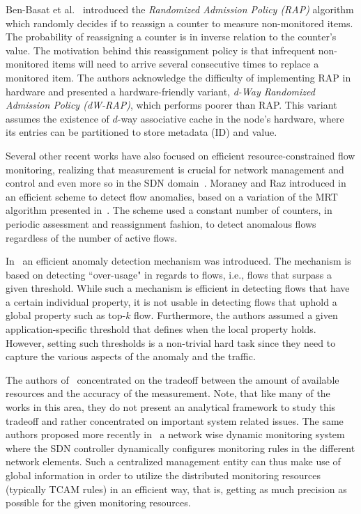 Ben-Basat et al.~\cite{Ben-Basat2017} introduced the \textit{Randomized Admission Policy (RAP)} algorithm which randomly decides if to reassign a counter to measure non-monitored items. The probability of reassigning a counter is in inverse relation to the counter's value. The motivation behind this reassignment policy is that infrequent non-monitored items will need to arrive several consecutive times to replace a monitored item. The authors acknowledge the difficulty of implementing RAP in hardware and presented a hardware-friendly variant, \textit{d-Way Randomized Admission Policy (dW-RAP)}, which performs poorer than RAP. This variant assumes the existence of $d$-way associative cache in the node's hardware, where its entries can be partitioned to store metadata (ID) and value.

Several other recent works have also focused on efficient resource-constrained flow monitoring, realizing that measurement is crucial for network management and control and even more so in the SDN domain~\cite{Moraney2016, Moshref2013, Moshref2014}. Moraney and Raz introduced in~\cite{Moraney2016} an efficient scheme to detect flow anomalies, based on a variation of the MRT algorithm presented in~\cite{Moshref2014}. The scheme used a constant number of counters, in periodic assessment and reassignment fashion, to detect anomalous flows regardless of the number of active flows.

In~\cite{Moraney2016} an efficient anomaly detection mechanism was introduced. The mechanism is based on detecting ``over-usage" in regards to flows, i.e., flows that surpass a given threshold. While such a mechanism is efficient in detecting flows that have a certain individual property, it is not usable in detecting flows that uphold a global property such as top-$k$ flow. Furthermore, the authors assumed a given application-specific threshold that defines when the local property holds. However, setting such thresholds is a non-trivial hard task since they need to capture the various aspects of the anomaly and the traffic.

The authors of~\cite{Moshref2013} concentrated on the tradeoff between the amount of available resources and the accuracy of the measurement. Note, that like many of the works in this area, they do not present an analytical framework to study this tradeoff and rather concentrated on important system related issues.
The same authors proposed more recently in~\cite{Moshref2014} a network wise dynamic monitoring system where the SDN controller dynamically configures monitoring rules in the different network elements. Such a centralized management entity can thus make use of global information in order to utilize the distributed monitoring resources (typically TCAM rules) in an efficient way, that is, getting as much precision as possible for the given monitoring resources.
